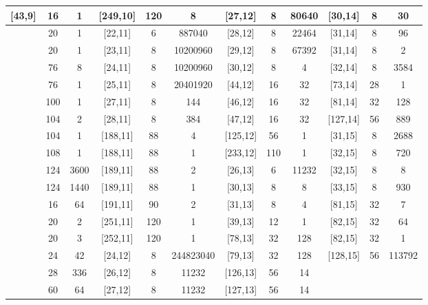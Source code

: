 \documentclass{article}
\begin{document}
\begin{longtable}{c|c|c||c|c|c||c|c|c||c|c|c}
[43,9] & 16 & 1
& [249,10] & 120 & 8
& [27,12] & 8 & 80640
& [30,14] & 8 & 30 \\
\hline
[49,9] & 20 & 1
& [22,11] & 6 & 887040
& [28,12] & 8 & 22464
& [31,14] & 8 & 96 \\
\hline
[50,9] & 20 & 1
& [23,11] & 8 & 10200960
& [29,12] & 8 & 67392
& [31,14] & 8 & 2 \\
\hline
[159,9] & 76 & 8
& [24,11] & 8 & 10200960
& [30,12] & 8 & 4
& [32,14] & 8 & 3584 \\
\hline
[160,9] & 76 & 1
& [25,11] & 8 & 20401920
& [44,12] & 16 & 32
& [73,14] & 28 & 1 \\
\hline
[208,9] & 100 & 1
& [27,11] & 8 & 144
& [46,12] & 16 & 32
& [81,14] & 32 & 128 \\
\hline
[215,9] & 104 & 2
& [28,11] & 8 & 384
& [47,12] & 16 & 32
& [127,14] & 56 & 889 \\
\hline
[216,9] & 104 & 1
& [188,11] & 88 & 4
& [125,12] & 56 & 1
& [31,15] & 8 & 2688 \\
\hline
[223,9] & 108 & 1
& [188,11] & 88 & 1
& [233,12] & 110 & 1
& [32,15] & 8 & 720 \\
\hline
[253,9] & 124 & 3600
& [189,11] & 88 & 2
& [26,13] & 6 & 11232
& [32,15] & 8 & 8 \\
\hline
[254,9] & 124 & 1440
& [189,11] & 88 & 1
& [30,13] & 8 & 8
& [33,15] & 8 & 930 \\
\hline
[42,10] & 16 & 64
& [191,11] & 90 & 2
& [31,13] & 8 & 4
& [81,15] & 32 & 7 \\
\hline
[49,10] & 20 & 2
& [251,11] & 120 & 1
& [39,13] & 12 & 1
& [82,15] & 32 & 64 \\
\hline
[50,10] & 20 & 3
& [252,11] & 120 & 1
& [78,13] & 32 & 128
& [82,15] & 32 & 1 \\
\hline
[58,10] & 24 & 42
& [24,12] & 8 & 244823040
& [79,13] & 32 & 128
& [128,15] & 56 & 113792 \\
\hline
[66,10] & 28 & 336
& [26,12] & 8 & 11232
& [126,13] & 56 & 14
& & & \\
\hline
[130,10] & 60 & 64
& [27,12] & 8 & 11232
& [127,13] & 56 & 14
& & & \\
\hline
\end{longtable}
\endgroup



\begingroup
\footnotesize
\renewcommand{\arraystretch}{1.3}
\setlength{\tabcolsep}{4pt}
\end{document}
